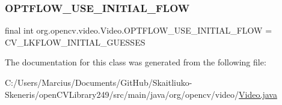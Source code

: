 \subsubsection{\texorpdfstring{O\+P\+T\+F\+L\+O\+W\+\_\+\+U\+S\+E\+\_\+\+I\+N\+I\+T\+I\+A\+L\+\_\+\+F\+L\+OW}{OPTFLOW\_USE\_INITIAL\_FLOW}}
{\footnotesize\ttfamily final int org.\+opencv.\+video.\+Video.\+O\+P\+T\+F\+L\+O\+W\+\_\+\+U\+S\+E\+\_\+\+I\+N\+I\+T\+I\+A\+L\+\_\+\+F\+L\+OW = C\+V\+\_\+\+L\+K\+F\+L\+O\+W\+\_\+\+I\+N\+I\+T\+I\+A\+L\+\_\+\+G\+U\+E\+S\+S\+ES\hspace{0.3cm}{\ttfamily [static]}}



The documentation for this class was generated from the following file\+:\begin{DoxyCompactItemize}
\item 
C\+:/\+Users/\+Marcius/\+Documents/\+Git\+Hub/\+Skaitliuko-\/\+Skeneris/open\+C\+V\+Library249/src/main/java/org/opencv/video/\mbox{\hyperlink{_video_8java}{Video.\+java}}\end{DoxyCompactItemize}
